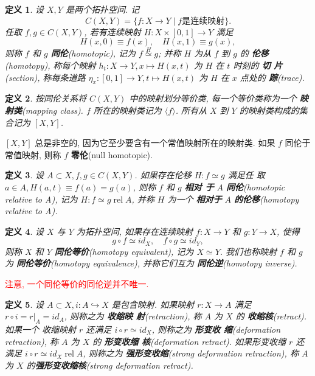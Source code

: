 \documentclass{ctexart}
\newtheorem*{defn}{定义}
\DeclareMathOperator{\rel}{rel}
\begin{document}
\begin{defn}
设 $X,Y$ 是两个拓扑空间. 记
\[
C(X,Y) = \{f : X \to Y \mid f \text{是连续映射}\}.
\]
任取 $f,g \in C(X,Y)$, 若有连续映射 $H : X \times [0,1] \to Y$ 满足
\[
H(x,0) \equiv f(x),\hspace{1em} H(x,1) \equiv g(x),
\]
则称 $f$ 和 $g$ \textbf{同伦}(homotopic), 记为 $f \overset{H}{\simeq}
g$; 并称 $H$ 为从 $f$ 到 $g$ 的 \textbf{伦移}(homotopy), 称每个映射
$h_t : X \to Y, x \mapsto H(x,t)$ 为 $H$ 在 $t$ 时刻的 \textbf{切
  片}(section), 称每条道路 $\eta_x : [0,1] \to Y, t \mapsto H(x,t)$ 为
$H$ 在 $x$ 点处的 \textbf{踪}(trace).
\end{defn}
\begin{defn}
按同伦关系将 $C(X,Y)$ 中的映射划分等价类, 每一个等价类称为一个
\textbf{映射类}(mapping class). $f$ 所在的映射类记为 $\langle f
\rangle$. 所有从 $X$ 到 $Y$ 的映射类构成的集合记为 $[X,Y]$.
\end{defn}

$[X,Y]$ 总是非空的, 因为它至少要含有一个常值映射所在的映射类. 如果 $f$
同伦于常值映射, 则称 $f$ \textbf{零伦}(null homotopic).

\begin{defn}
设 $A \subset X, f,g \in C(X,Y)$. 如果存在伦移 $H : f \simeq g$ 满足任
取 $a \in A, H(a,t) \equiv f(a) = g(a)$, 则称 $f$ 和 $g$ \textbf{相对
  于} $A$ \textbf{同伦}(homotopic relative to A), 记为 $H : f \simeq g
\rel A$, 并称 $H$ 为一个 \textbf{相对于} $A$ \textbf{的伦移}(homotopy
relative to A).
\end{defn}

\begin{defn}
设 $X$ 与 $Y$ 为拓扑空间, 如果存在连续映射 $f : X \to Y$ 和 $g : Y \to
X$, 使得
\[
g \circ f \simeq id_X, \hspace{1em} f \circ g \simeq id_Y,
\]
则称 $X$ 和 $Y$ \textbf{同伦等价}(homotopy equivalent), 记为 $X \simeq
Y$. 我们也称映射 $f$ 和 $g$ 为 \textbf{同伦等价}(homotopy
equivalence), 并称它们互为 \textbf{同伦逆}(homotopy inverse).
\end{defn}
\textcolor{red}{注意, 一个同伦等价的同伦逆并不唯一.}

\begin{defn}
设 $A \subset X, i : A \hookrightarrow X$ 是包含映射. 如果映射 $r : X
\to A$ 满足 $r \circ i = r|_A = id_A$, 则称之为 \textbf{收缩映
  射}(retraction), 称 $A$ 为 $X$ 的 \textbf{收缩核}(retract). 如果一个
收缩映射 $r$ 还满足 $i \circ r \simeq id_X$, 则称之为 \textbf{形变收
  缩}(deformation retraction), 称 $A$ 为 $X$ 的 \textbf{形变收缩
  核}(deformation retract). 如果形变收缩 $r$ 还满足 $i \circ r \simeq
id_X \rel A$, 则称之为 \textbf{强形变收缩}(strong deformation
retraction), 称 $A$ 为 $X$ 的\textbf{强形变收缩核}(strong deformation retract).
\end{defn}
\end{document}
